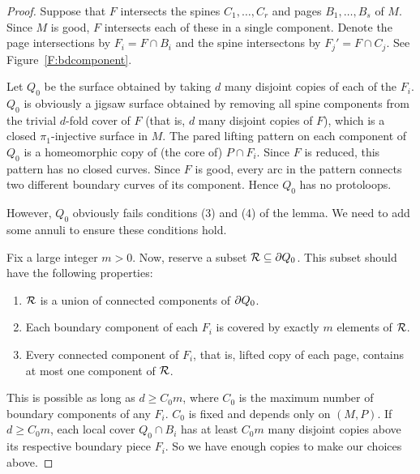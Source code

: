 \begin{proof}

Suppose that $F$ intersects the spines $C_1,\dots,C_r$ and pages
$B_1,\dots,B_s$ of $M$.  Since $M$ is good, $F$ intersects each of these in
a single component.  Denote the page intersections by $F_i = F \cap B_i$ and
the spine intersectons by $F_j' = F \cap C_j$. See Figure~\ref{F:bdcomponent}.


Let $Q_0$ be the surface obtained by taking $d$ many disjoint copies of each of
the $F_i$. $Q_0$ is obviously a jigsaw surface obtained by
removing all spine components from the trivial $d$-fold cover of $F$ (that is,
$d$ many disjoint copies of $F$), which is a closed $\pi_1$-injective surface
in $M$.  The pared lifting pattern on each component of $Q_0$ is a homeomorphic
copy of (the core of) $P \cap F_i$. Since $F$ is reduced, this pattern has no
closed curves.  Since $F$ is good, every arc in the pattern connects two
different boundary curves of its component. Hence $Q_0$ has no protoloops.

However, $Q_0$ obviously fails conditions (3) and (4) of the lemma. We need to
add some annuli to ensure these conditions hold.

Fix a large integer $m>0$. Now, reserve a subset $\mathcal{R} \subseteq \partial Q_0$.  This
subset should have the following properties:

\begin{enumerate}

\item $\mathcal{R}$ is a union of connected components of $\partial Q_0$.

\item Each boundary component of each $F_i$ is covered by exactly $m$ elements
of $\mathcal{R}$.

\item Every connected component of $F_i$, that is, lifted copy of each page,
contains at most one component of $\mathcal{R}$.

\end{enumerate}

This is possible as long as $d \geq C_0m$, where $C_0$ is the maximum number of
boundary components of any $F_i$. $C_0$ is fixed and depends only on $(M,P)$.
If $d\geq C_0m$,  each local cover $Q_0 \cap B_i$ has at least $C_0m$ many
disjoint copies above its respective boundary piece $F_i$.  So we have enough
copies to make our choices above.


\end{proof}
